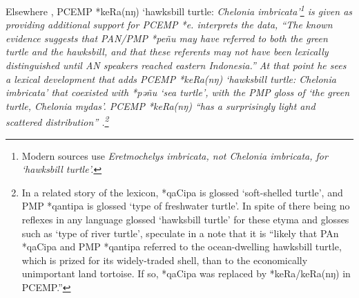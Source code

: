 Elsewhere \citep[46]{Blust2009},
PCEMP *keRa(nŋ) ‘hawksbill turtle: \it{Chelonia imbricata}’\footnote{
		Modern sources use \it{Eretmochelys imbricata}, not \it{Chelonia
		imbricata}, for ‘hawksbill turtle’.}
is given as providing additional
support for PCEMP *e.
 \citet[45]{Blust2009} interprets the data,
“The known evidence suggests that PAN/PMP *peñu may have referred
to both the green turtle
and the hawksbill, and that these referents may not have been
lexically distinguished until AN speakers reached eastern Indonesia.”
At that point he sees a lexical development that adds PCEMP *keRa(nŋ)
‘hawksbill turtle: \it{Chelonia imbricata}’ that coexisted with
 *pəñu ‘sea turtle’,
with the PMP gloss of ‘the green turtle, \it{Chelonia mydas’}.
PCEMP *keRa(nŋ) “has a surprisingly light
and scattered distribution” \citeyear[46]{Blust2009}.\footnote{
		In a related
		story of the lexicon,
		 *qaCipa is glossed ‘soft-shelled turtle’,
		and PMP *qantipa is glossed ‘type of freshwater turtle’.
		In spite of there being no reflexes in any language glossed ‘hawksbill
		turtle’ for these etyma
		and glosses such as ‘type of river turtle’,
		\citet{BlustTrussel2020} speculate in a note that it is “likely
		that PAn *qaCipa and PMP *qantipa referred to the ocean-dwelling hawksbill turtle,
		which is prized for its widely-traded shell,
		than to the economically unimportant land tortoise.
		If so, *qaCipa was replaced by *keRa/keRa(nŋ) in PCEMP.”}

